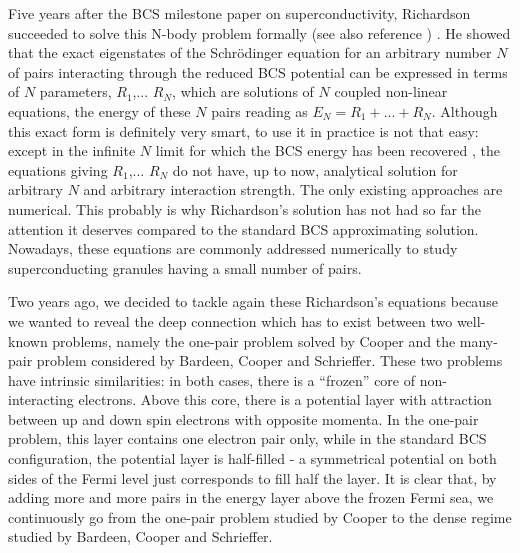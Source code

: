 \documentclass[epj]{svjour}
\begin{document}
Five years after the BCS milestone paper\cite{BCS} on superconductivity, Richardson succeeded to solve this N-body problem formally\cite{Richardson1,Richardson2,Richardson1968,Richardson3} (see also reference \cite{gaudin,Ushveridze}) . He showed that 
the exact eigenstates of the Schr\"{o}dinger equation for an arbitrary number $N$ of pairs interacting through the reduced BCS potential can be expressed in terms
of $N$ parameters, $R_{1}$,... $R_{N}$, which are solutions of $N$ coupled
non-linear equations, the energy of these $N$ pairs reading as $E
_{N}=R_{1}+...+R_{N}$. Although this exact form is definitely very smart, to
use it in practice is not that easy: except in the infinite $N$ limit for which the BCS energy has been recovered \cite{Richardson3}, the equations giving $R_{1}$,... $R_{N}$  do not have, up to now, analytical solution for arbitrary $N$ and arbitrary interaction strength. The only existing approaches are numerical\cite{Duk,ortiz,delft}. This probably is why Richardson's solution has not had so far the
attention it deserves compared to the standard BCS approximating solution. Nowadays, these equations 
are commonly addressed numerically to study superconducting granules having a small number of pairs\cite{Duk,delft2001,sierra2000,schechter2001}. 

Two years ago, we decided to tackle again these Richardson's equations because we wanted to reveal the deep connection which has to exist between two well-known problems, namely the
one-pair problem solved by Cooper and the many-pair problem considered by Bardeen, Cooper and Schrieffer. 
These two problems have intrinsic similarities: in
both cases, there is a ``frozen'' core of non-interacting electrons. Above this core, there is
a potential layer with attraction between up and
down spin electrons with opposite momenta. In the one-pair problem, this layer contains one electron pair 
only, while in the standard BCS configuration, the potential
layer is half-filled - a symmetrical potential 
on both sides of the Fermi level just corresponds to fill half the layer.
It is clear that, by adding more and more pairs in the energy layer above  the frozen Fermi sea, we continuously go from the one-pair problem studied by Cooper to the dense regime studied by Bardeen, Cooper and Schrieffer. 
\end{document}
